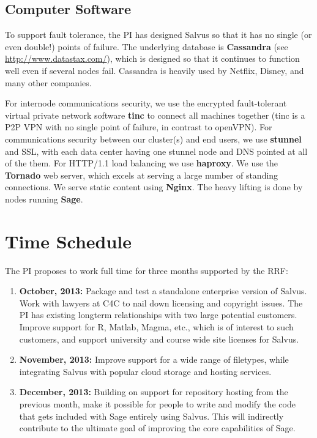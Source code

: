 \documentclass[11pt]{article}
\begin{document}
\subsection{Computer Software}

To support fault tolerance, the PI has designed Salvus so that it has
no single (or even double!) points of failure.  The underlying
database is {\bf Cassandra} (see \url{http://www.datastax.com/}),
which is designed so that it continues to function well even if
several nodes fail.  Cassandra is
heavily used by Netflix, Disney, and many other companies.

For internode communications security, we use the encrypted
fault-tolerant virtual private network software {\bf tinc} to connect
all machines together (tinc is a P2P VPN with no single
point of failure, in contrast to openVPN).  For communications
security between our cluster(s) and end users, we use {\bf stunnel}
and SSL, with each data center having one stunnel node and DNS pointed
at all of the them.  For HTTP/1.1 load balancing we use {\bf haproxy}.
We use the {\bf Tornado} web server, which excels at serving a large
number of standing connections.  We serve static content using {\bf
  Nginx}.  The heavy lifting is done by nodes
running {\bf Sage}.


\section{Time Schedule}

The PI proposes to work full time for three months supported by the RRF:

\begin{enumerate}
\item {\bf October, 2013:} Package and test a standalone enterprise
  version of Salvus.  Work with lawyers at C4C to nail down licensing
  and copyright issues. The PI has existing longterm relationships
  with two large potential customers.  Improve support
  for R, Matlab, Magma, etc., which is of interest to such customers,
  and support university and course wide site licenses for Salvus.

\item {\bf November, 2013:} Improve support for a wide range of
  filetypes, while integrating Salvus with popular cloud storage and
  hosting services.
\item {\bf December, 2013:} Building on support for repository hosting
  from the previous month, make it possible for people to write and
  modify the code that gets included with Sage entirely using Salvus.
  This will indirectly contribute to the ultimate goal of improving
  the core capabilities of Sage.
\end{enumerate}
\end{document}
